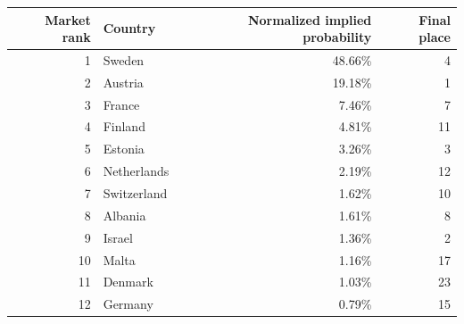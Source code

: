 \begin{tabular}{rlrr}
\toprule
Market rank & Country & Normalized implied probability & Final place \\
\midrule
1 & Sweden & 48.66\% & 4 \\
2 & Austria & 19.18\% & 1 \\
3 & France & 7.46\% & 7 \\
4 & Finland & 4.81\% & 11 \\
5 & Estonia & 3.26\% & 3 \\
6 & Netherlands & 2.19\% & 12 \\
7 & Switzerland & 1.62\% & 10 \\
8 & Albania & 1.61\% & 8 \\
9 & Israel & 1.36\% & 2 \\
10 & Malta & 1.16\% & 17 \\
11 & Denmark & 1.03\% & 23 \\
12 & Germany & 0.79\% & 15 \\
\bottomrule
\end{tabular}
